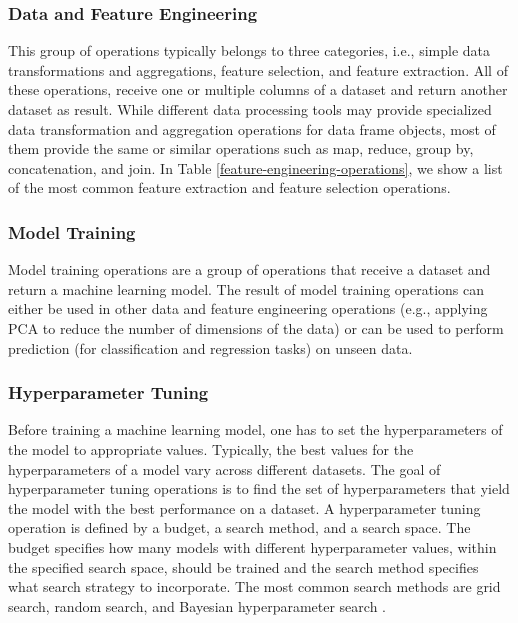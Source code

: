 \subsubsection{Data and Feature Engineering}
This group of operations typically belongs to three categories, i.e., simple data transformations and aggregations, feature selection, and feature extraction.
All of these operations, receive one or multiple columns of a dataset and return another dataset as result. 
While different data processing tools may provide specialized data transformation and aggregation operations for data frame objects, most of them provide the same or similar operations such as map, reduce, group by, concatenation, and join. 
In Table \ref{feature-engineering-operations}, we show a list of the most common feature extraction and feature selection operations.

\subsubsection{Model Training}
Model training operations are a group of operations that receive a dataset and return a machine learning model.
The result of model training operations can either be used in other data and feature engineering operations (e.g., applying PCA to reduce the number of dimensions of the data) or can be used to perform prediction (for classification and regression tasks) on unseen data.

\subsubsection{Hyperparameter Tuning}
Before training a machine learning model, one has to set the hyperparameters of the model to appropriate values.
Typically, the best values for the hyperparameters of a model vary across different datasets.
The goal of hyperparameter tuning operations is to find the set of hyperparameters that yield the model with the best performance on a dataset.
A hyperparameter tuning operation is defined by a budget, a search method, and a search space.
The budget specifies how many models with different hyperparameter values, within the specified search space, should be trained and the search method specifies what search strategy to incorporate.
The most common search methods are grid search, random search, and Bayesian hyperparameter search \cite{bergstra2012random,snoek2012practical}.

